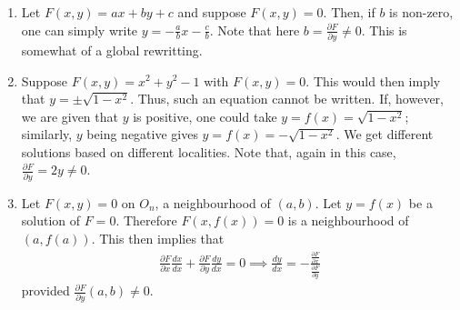 \begin{example}
    \begin{enumerate}
        \item Let $F(x,y) = ax+by+c$ and suppose $F(x,y) = 0$. Then, if $b$ is non-zero, one can simply write $y = -\frac{a}{b}x - \frac{c}{b}$. Note that here $b = \frac{\partial F}{\partial y} \neq 0$. This is somewhat of a global rewritting.
        \item Suppose $F(x,y) = x^{2}+y^{2}-1$ with $F(x,y) = 0$. This would then imply that $y = \pm \sqrt{1-x^{2}}$. Thus, such an equation cannot be written. If, however, we are given that $y$ is positive, one could take $y = f(x) = \sqrt{1-x^{2}}$; similarly, $y$ being negative gives $y = f(x) = -\sqrt{1-x^{2}}$. We get different solutions based on different localities. Note that, again in this case, $\frac{\partial F}{\partial y} = 2y \neq 0$.
        
        \item Let $F(x,y) = 0$ on $O_{n}$, a neighbourhood of $(a,b)$. Let $y = f(x)$ be a solution of $F = 0$. Therefore $F(x,f(x)) = 0$ is a neighbourhood of $(a,f(a))$. This then implies that
        \begin{align}
            \frac{\partial F}{\partial x} \frac{dx}{dx} + \frac{\partial F}{\partial y} \frac{dy}{dx} = 0 \implies \frac{dy}{dx} = -\frac{\frac{\partial F}{\partial x}}{\frac{\partial F}{\partial y}}
        \end{align}
        provided $\frac{\partial F}{\partial y}(a,b) \neq 0$.
    \end{enumerate}
\end{example}